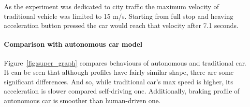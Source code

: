 \documentclass[11pt,english,twoside]{article}
\begin{document}
As the experiment was dedicated to city traffic the maximum velocity of traditional vehicle was limited to 15 m/s. Starting from full stop and heaving acceleration button pressed the car would reach that velocity after 7.1 seconds.






















\paragraph{Comparison with autonomous car model}


Figure~\ref{fig:super_graph} compares behaviours of autonomous and traditional car. It can be seen that although profiles have fairly similar shape, there are some significant differences. And so, while traditional car's max speed is higher, its acceleration is slower compared self-driving one. Additionally, braking profile of autonomous car is smoother than human-driven one.

\end{document}
